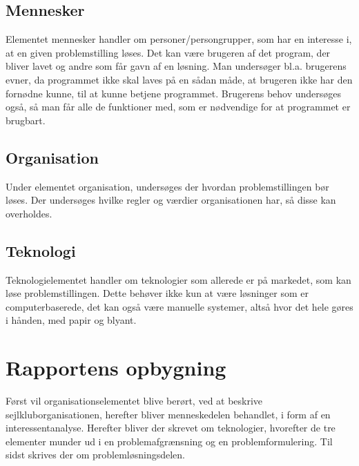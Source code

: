 \subsection{Mennesker}\label{subsec:mennesker}

Elementet mennesker handler om personer/persongrupper, som har en interesse i, at en given problemstilling
løses. Det kan være brugeren af det program, der bliver lavet og andre som får gavn af en løsning. Man
undersøger bl.a. brugerens evner, da programmet ikke skal laves på en sådan måde, at brugeren ikke har den
fornødne kunne, til at kunne betjene programmet. Brugerens behov undersøges også, så man får alle de funktioner
med, som er nødvendige for at programmet er brugbart.


\subsection{Organisation}\label{subsec:organisation}

Under elementet organisation, undersøges der hvordan problemstillingen bør løses. Der undersøges hvilke regler
og værdier organisationen har, så disse kan overholdes.


\subsection{Teknologi}\label{subsec:Teknologi}

Teknologielementet handler om teknologier som allerede er på markedet, som kan løse problemstillingen. Dette
behøver ikke kun at være løsninger som er computerbaserede, det kan også være manuelle systemer, altså hvor
det hele gøres i hånden, med papir og blyant.


\section{Rapportens opbygning}\label{sec:rapportens-opbygning}

Først vil organisationselementet blive berørt, ved at beskrive sejlkluborganisationen, herefter bliver
menneskedelen behandlet, i form af en interessentanalyse. Herefter bliver der skrevet om teknologier,
hvorefter de tre elementer munder ud i en problemafgrænsning og en problemformulering. Til sidst skrives der
om problemløsningsdelen.
